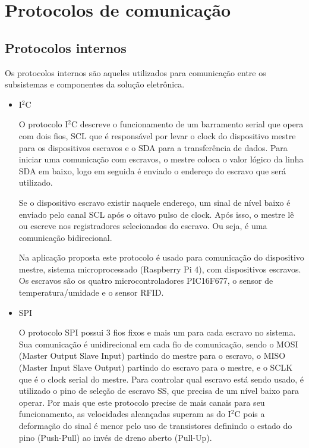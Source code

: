 \section{Protocolos de comunicação}
\subsection{Protocolos internos}

Os protocolos internos são aqueles utilizados para comunicação entre os subsistemas e componentes da solução eletrônica.

\begin{itemize}
    \item I$^2$C
    
    O protocolo I$^2$C descreve o funcionamento de um barramento serial que opera com dois fios, SCL que é responsável por levar o clock do dispositivo mestre para os dispositivos escravos e o SDA para a transferência de dados. Para iniciar uma comunicação com escravos, o mestre coloca o valor lógico da linha SDA em baixo, logo em seguida é enviado o endereço do escravo que será utilizado. 
    
    Se o dispositivo escravo existir naquele endereço, um sinal de nível baixo é enviado pelo canal SCL após o oitavo pulso de clock. Após isso, o mestre lê ou escreve nos registradores selecionados do escravo. Ou seja, é uma comunicação bidirecional. 
    
    Na aplicação proposta este protocolo é usado para comunicação do dispositivo mestre, sistema microprocessado (Raspberry Pi 4), com dispositivos escravos. Os escravos são os quatro microcontroladores PIC16F677, o sensor de temperatura/umidade e o sensor RFID. 
    \newpage
    \item SPI
    
    O protocolo SPI possui 3 fios fixos e mais um para cada escravo no sistema. Sua comunicação é unidirecional em cada fio de comunicação, sendo o MOSI (Master Output Slave Input) partindo do mestre para o escravo, o MISO (Master Input Slave Output) partindo do escravo para o mestre, e o SCLK que é o clock serial do mestre. Para controlar qual escravo está sendo usado, é utilizado o pino de seleção de escravo SS, que precisa de um nível baixo para operar. Por mais que este protocolo precise de mais canais para seu funcionamento, as velocidades alcançadas  superam as do I$^2$C pois a deformação do sinal é menor pelo uso de transistores definindo o estado do pino (Push-Pull) ao invés de dreno aberto (Pull-Up).
    

\end{itemize}
